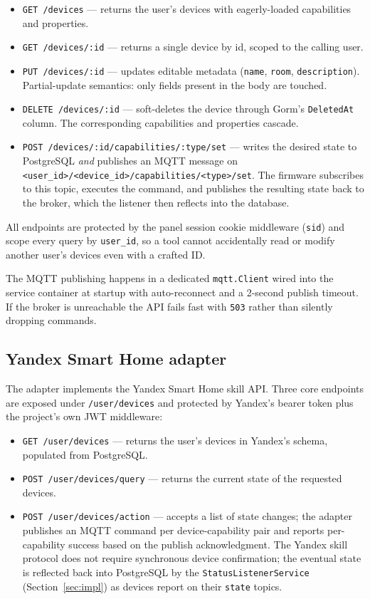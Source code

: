 \documentclass[a4paper,12pt]{article}
\begin{document}
\begin{itemize}
  \item \verb|GET /devices| --- returns the user's devices with eagerly-loaded capabilities and properties.
  \item \verb|GET /devices/:id| --- returns a single device by id, scoped to the calling user.
  \item \verb|PUT /devices/:id| --- updates editable metadata (\verb|name|, \verb|room|, \verb|description|). Partial-update semantics: only fields present in the body are touched.
  \item \verb|DELETE /devices/:id| --- soft-deletes the device through Gorm's \verb|DeletedAt| column. The corresponding capabilities and properties cascade.
  \item \verb|POST /devices/:id/capabilities/:type/set| --- writes the desired state to PostgreSQL \emph{and} publishes an MQTT message on \verb|<user_id>/<device_id>/capabilities/<type>/set|. The firmware subscribes to this topic, executes the command, and publishes the resulting state back to the broker, which the listener then reflects into the database.
\end{itemize}

All endpoints are protected by the panel session cookie middleware (\verb|sid|) and scope every query by \verb|user_id|, so a tool cannot accidentally read or modify another user's devices even with a crafted ID.

The MQTT publishing happens in a dedicated \verb|mqtt.Client| wired into the service container at startup with auto-reconnect and a 2-second publish timeout. If the broker is unreachable the API fails fast with \verb|503| rather than silently dropping commands.

\subsection{Yandex Smart Home adapter}

The adapter implements the Yandex Smart Home skill API. Three core endpoints are exposed under \verb|/user/devices| and protected by Yandex's bearer token plus the project's own JWT middleware:

\begin{itemize}
  \item \verb|GET /user/devices| --- returns the user's devices in Yandex's schema, populated from PostgreSQL.
  \item \verb|POST /user/devices/query| --- returns the current state of the requested devices.
  \item \verb|POST /user/devices/action| --- accepts a list of state changes; the adapter publishes an MQTT command per device-capability pair and reports per-capability success based on the publish acknowledgment. The Yandex skill protocol does not require synchronous device confirmation; the eventual state is reflected back into PostgreSQL by the \verb|StatusListenerService| (Section~\ref{sec:impl}) as devices report on their \verb|state| topics.
\end{itemize}
\end{document}
